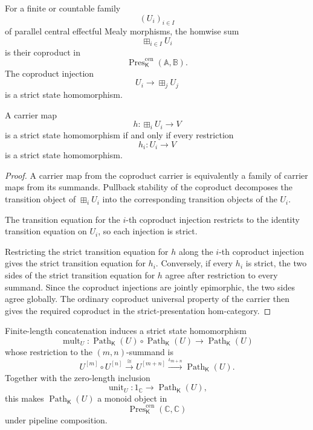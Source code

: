 \begin{lemma}
\label{lem:strict-presentation-homwise-coproducts}
For a finite or countable family
\[
    (U_i)_{i\in I}
\]
of parallel central effectful Mealy morphisms, the homwise sum
\[
    \boxplus_{i\in I}U_i
\]
is their coproduct in
\[
    \operatorname{Pres}^{\mathrm{cen}}_{\mathsf K}
    (\mathbb A,\mathbb B).
\]
The coproduct injection
\[
    U_i\longrightarrow\boxplus_jU_j
\]
is a strict state homomorphism.

A carrier map
\[
    h:
    \boxplus_iU_i
    \longrightarrow
    V
\]
is a strict state homomorphism if and only if every restriction
\[
    h_i:
    U_i
    \longrightarrow
    V
\]
is a strict state homomorphism.
\end{lemma}

\begin{proof}
A carrier map from the coproduct carrier is equivalently a family of carrier
maps from its summands.  Pullback stability of the coproduct decomposes the
transition object of \(\boxplus_iU_i\) into the corresponding transition
objects of the \(U_i\).

The transition equation for the \(i\)-th coproduct injection restricts to the
identity transition equation on \(U_i\), so each injection is strict.

Restricting the strict transition equation for \(h\) along the \(i\)-th
coproduct injection gives the strict transition equation for \(h_i\).
Conversely, if every \(h_i\) is strict, the two sides of the strict transition
equation for \(h\) agree after restriction to every summand.  Since the
coproduct injections are jointly epimorphic, the two sides agree globally.
The ordinary coproduct universal property of the carrier then gives the
required coproduct in the strict-presentation hom-category.
\end{proof}

\begin{proposition}
\label{prop:effectful-path-multiplication}
Finite-length concatenation induces a strict state homomorphism
\[
    \operatorname{mult}_U:
    \operatorname{Path}_{\mathsf K}(U)
    \circ
    \operatorname{Path}_{\mathsf K}(U)
    \longrightarrow
    \operatorname{Path}_{\mathsf K}(U)
\]
whose restriction to the \((m,n)\)-summand is
\[
    U^{[m]}\circ U^{[n]}
    \xrightarrow{\cong}
    U^{[m+n]}
    \xrightarrow{\iota_{m+n}}
    \operatorname{Path}_{\mathsf K}(U).
\]
Together with the zero-length inclusion
\[
    \operatorname{unit}_U:
    1_{\mathbb C}
    \longrightarrow
    \operatorname{Path}_{\mathsf K}(U),
\]
this makes
\(\operatorname{Path}_{\mathsf K}(U)\) a monoid object in
\[
    \operatorname{Pres}^{\mathrm{cen}}_{\mathsf K}
    (\mathbb C,\mathbb C)
\]
under pipeline composition.
\end{proposition}

